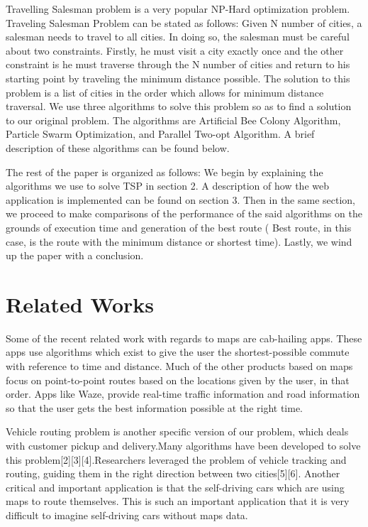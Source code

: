 \documentclass[conference]{IEEEtran}
\begin{document}
Travelling Salesman problem is a very popular NP-Hard optimization problem. Traveling Salesman Problem can be stated as follows: Given N number of cities, a salesman needs to travel to all cities. In doing so, the salesman must be careful about two constraints. Firstly, he must visit a city exactly once and the other constraint is he must traverse through the N number of cities and return to his starting point by traveling the minimum distance possible. The solution to this problem is a list of cities in the order which allows for minimum distance traversal. We use three algorithms to solve this problem so as to find a solution to our original problem. The algorithms are Artificial Bee Colony Algorithm, Particle Swarm Optimization, and Parallel Two-opt Algorithm. A brief description of these algorithms can be found below.


The rest of the paper is organized as follows: We begin by explaining the algorithms we use to solve TSP in section 2. A description of how the web application is implemented can be found on section 3. Then in the same section, we proceed to make comparisons of the performance of the said algorithms on the grounds of execution time and generation of the best route ( Best route, in this case, is the route with the minimum distance or shortest time). Lastly, we wind up the paper with a conclusion.

\section {Related Works}
Some of the recent related work with regards to maps are cab-hailing apps. These apps use algorithms which exist to give the user the shortest-possible commute with reference to time and distance. Much of the other products based on maps focus on point-to-point routes based on the locations given by the user, in that order. Apps like Waze, provide real-time traffic information and road information so that the user gets the best information possible at the right time.

Vehicle routing problem is another specific version of our problem, which deals with customer pickup and delivery.Many algorithms have been developed to solve this problem[2][3][4].Researchers leveraged the problem of vehicle tracking and routing, guiding them in the right direction between two cities[5][6]. Another critical and important application is that the self-driving cars which are using maps to route themselves. This is such an important application that it is very difficult to imagine self-driving cars without maps data.
\end{document}
